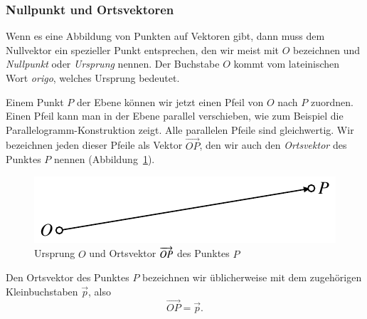 \subsubsection{Nullpunkt und Ortsvektoren}
Wenn es eine Abbildung von Punkten auf Vektoren gibt, dann muss dem
Nullvektor ein spezieller Punkt entsprechen, den wir meist mit 
$O$ bezeichnen und {\em Nullpunkt} oder {\em Ursprung} nennen.
Der Buchstabe $O$ kommt vom lateinischen Wort {\it origo}, welches
Ursprung bedeutet.

Einem Punkt $P$ der Ebene können wir jetzt einen Pfeil
von $O$ nach $P$ zuordnen.
Einen Pfeil kann man in der Ebene parallel verschieben,
wie zum Beispiel die Parallelogramm-Konstruktion zeigt.
Alle parallelen Pfeile sind gleichwertig.
Wir bezeichnen jeden dieser Pfeile als Vektor $\overrightarrow{OP}$, den
wir auch den {\em Ortsvektor} des Punktes $P$ nennen
(Abbildung~\ref{skript:affin:ortsvektor}).
\begin{figure}
\centering
\includegraphics{3/images/vektor.pdf}
\caption{
Ursprung $O$ und Ortsvektor $\protect\overrightarrow{OP}$ des Punktes $P$
\label{skript:affin:ortsvektor}
}
\end{figure}

\begin{konvention}
Den Ortsvektor des Punktes $P$ bezeichnen wir üblicherweise mit dem 
zugehörigen Kleinbuchstaben $\vec{p}$, also
\[
\overrightarrow{OP} = \vec{p}.
\]
\end{konvention}

